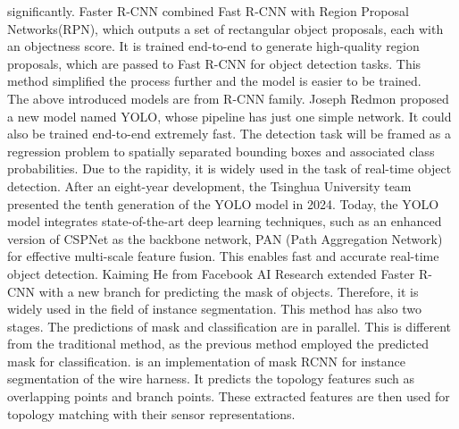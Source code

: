     significantly. Faster R-CNN combined Fast R-CNN with Region Proposal Networks(RPN), which outputs a set of rectangular object proposals, each with an objectness
    score\cite{NIPS2015_14bfa6bb}. It is trained end-to-end to generate high-quality region proposals, which are passed to Fast R-CNN for object detection tasks.
    This method simplified the process further and the model is easier to be trained.\\
    The above introduced models are from R-CNN family. Joseph Redmon proposed a new model named YOLO, whose pipeline has just one simple network. It could also be 
    trained end-to-end extremely fast\cite{Redmon_2016_CVPR}. The detection task will be framed as a regression problem to spatially separated bounding boxes and
    associated class probabilities. Due to the rapidity, it is widely used in the task of real-time object detection. After an eight-year development, the Tsinghua 
    University team presented the tenth generation of the YOLO model in 2024\cite{wang2024yolov10}. Today, the YOLO model integrates state-of-the-art deep learning 
    techniques, such as an enhanced version of CSPNet\cite{Wang2019CSPNetAN} as the backbone network, PAN (Path Aggregation Network) for effective multi-scale feature
    fusion\cite{Liu_2018_CVPR}. This enables fast and accurate real-time object detection.
    Kaiming He from Facebook AI Research extended Faster R-CNN\cite{NIPS2015_14bfa6bb} with a new branch for predicting the mask of objects\cite{He_2017_ICCV}. Therefore, it is widely 
    used in the field of instance segmentation. This method has also two stages. The predictions of mask and classification are in parallel. This is different from 
    the traditional method, as the previous method employed the predicted mask for classification. 
    \cite{10260646} is an implementation of mask RCNN for instance segmentation of the wire harness. It predicts the topology features such as overlapping points and branch
    points. These extracted features are then used for topology matching with their sensor representations.\\
